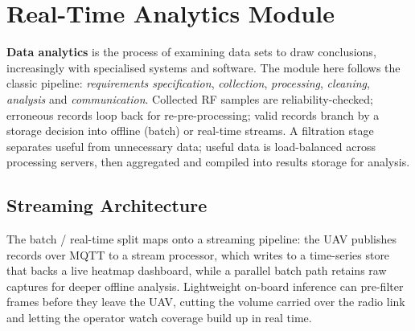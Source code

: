 \chapter{Real-Time Analytics Module}
\label{ch:analytics}

\textbf{Data analytics} is the process of examining data sets to draw
conclusions, increasingly with specialised systems and software. The module here
follows the classic pipeline: \emph{requirements specification}, \emph{collection},
\emph{processing}, \emph{cleaning}, \emph{analysis} and \emph{communication}.
Collected RF samples are reliability-checked; erroneous records loop back for
re-pre-processing; valid records branch by a storage decision into offline
(batch) or real-time streams. A filtration stage separates useful from
unnecessary data; useful data is load-balanced across processing servers, then
aggregated and compiled into results storage for analysis.

\section{Streaming Architecture}
The batch / real-time split maps onto a streaming pipeline: the UAV publishes
records over MQTT to a stream processor, which writes to a time-series store that
backs a live heatmap dashboard, while a parallel batch path retains raw captures
for deeper offline analysis. Lightweight on-board inference can pre-filter frames
before they leave the UAV, cutting the volume carried over the radio link and
letting the operator watch coverage build up in real time.

